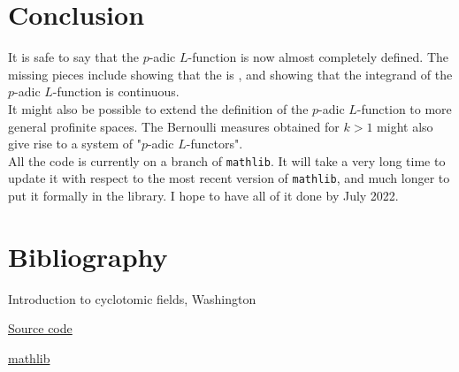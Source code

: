 \documentclass[11pt]{article}
\begin{document}
\section{Conclusion}
It is safe to say that the $p$-adic $L$-function is now almost completely defined. The missing pieces
include showing that the  is , and showing that the integrand
of the $p$-adic $L$-function is continuous. \\

It might also be possible to extend the definition of the $p$-adic $L$-function to more general profinite
spaces. The Bernoulli measures obtained for $k > 1$ might also give rise to a system of "$p$-adic $L$-functors". \\

All the code is currently on a branch of \texttt{mathlib}. It will take a very long time to update it
with respect to the most recent version of \texttt{mathlib}, and much longer to put it formally in the
library. I hope to have all of it done by July 2022.

\section{Bibliography}
\begin{thebibliography}{}


 Introduction to cyclotomic fields, Washington

 \href{https://github.com/leanprover-community/mathlib/tree/p-adic}{Source code}

 \href{https://github.com/leanprover-community/mathlib/tree/master}{mathlib}
\end{thebibliography}
\end{document}
